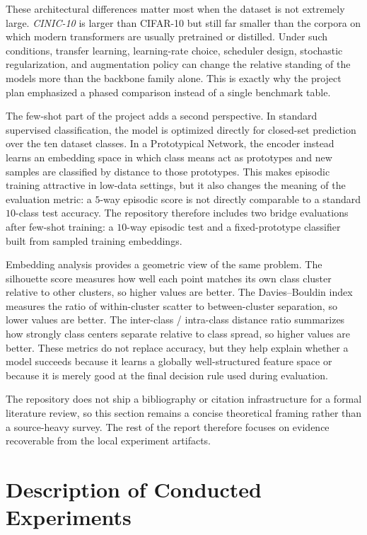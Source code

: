 \documentclass[12pt,a4paper]{article}
\begin{document}
These architectural differences matter most when the dataset is not extremely large. \emph{CINIC-10} is larger than CIFAR-10 but still far smaller than the corpora on which modern transformers are usually pretrained or distilled. Under such conditions, transfer learning, learning-rate choice, scheduler design, stochastic regularization, and augmentation policy can change the relative standing of the models more than the backbone family alone. This is exactly why the project plan emphasized a phased comparison instead of a single benchmark table.

The few-shot part of the project adds a second perspective. In standard supervised classification, the model is optimized directly for closed-set prediction over the ten dataset classes. In a Prototypical Network, the encoder instead learns an embedding space in which class means act as prototypes and new samples are classified by distance to those prototypes. This makes episodic training attractive in low-data settings, but it also changes the meaning of the evaluation metric: a $5$-way episodic score is not directly comparable to a standard $10$-class test accuracy. The repository therefore includes two bridge evaluations after few-shot training: a $10$-way episodic test and a fixed-prototype classifier built from sampled training embeddings.

Embedding analysis provides a geometric view of the same problem. The silhouette score measures how well each point matches its own class cluster relative to other clusters, so higher values are better. The Davies--Bouldin index measures the ratio of within-cluster scatter to between-cluster separation, so lower values are better. The inter-class / intra-class distance ratio summarizes how strongly class centers separate relative to class spread, so higher values are better. These metrics do not replace accuracy, but they help explain whether a model succeeds because it learns a globally well-structured feature space or because it is merely good at the final decision rule used during evaluation.

The repository does not ship a bibliography or citation infrastructure for a formal literature review, so this section remains a concise theoretical framing rather than a source-heavy survey. The rest of the report therefore focuses on evidence recoverable from the local experiment artifacts.

\section{Description of Conducted Experiments}
\label{sec:experiments}
\end{document}
